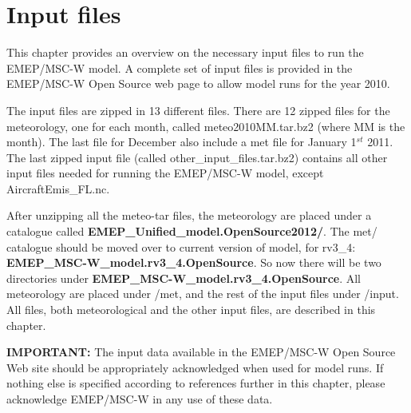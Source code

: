\chapter{Input files}
\label{ch:InputFiles}

This chapter provides an overview on the necessary input files to run the 
EMEP/MSC-W model. A complete set of input files is provided in the EMEP/MSC-W 
Open Source web page to allow model runs for the year 2010. 

The input files are zipped in 13 different files. There are 12 zipped files 
for the meteorology, one for each month, called meteo2010MM.tar.bz2 (where MM 
is the month). 
The last file for December also include a met file for January 1$^{st}$ 2011. 
The last zipped input file (called other\_input\_files.tar.bz2) contains all 
other input files needed for running the EMEP/MSC-W model, except 
AircraftEmis\_FL.nc.

After unzipping all the meteo-tar files, the meteorology are placed under a
catalogue called {\bf EMEP\_Unified\_model.OpenSource2012/}. The met/
catalogue should be moved over to current version of model, for rv3\_4:
{\bf EMEP\_MSC-W\_model.rv3\_4.OpenSource}. 
So now there will be two directories under 
{\bf EMEP\_MSC-W\_model.rv3\_4.OpenSource}. 
All meteorology are placed under /met, and the rest of the input files under 
/input. 
All files, both meteorological and the other input files, are described in 
this chapter.

{\bf IMPORTANT:} The input data available in the EMEP/MSC-W Open Source Web
site should be appropriately acknowledged when used for model runs.
If nothing else is specified according to references further in this
chapter, please acknowledge EMEP/MSC-W in any use of these data.

